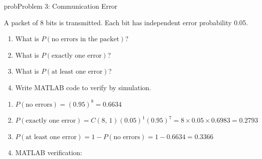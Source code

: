 \begin{PSbox}[unbreakable]{prob}{Problem 3: Communication Error}

A packet of 8 bits is transmitted. Each bit has independent error probability 0.05.

\begin{enumerate}
\def\labelenumi{(\alph{enumi})}
\tightlist
\item
  What is $P(\text{no errors in the packet})$?
\item
  What is $P(\text{exactly one error})$?
\item
  What is $P(\text{at least one error})$?
\item
  Write MATLAB code to verify by simulation.
\end{enumerate}

\PSsolution{} 

\begin{enumerate}
\def\labelenumi{(\alph{enumi})}
\item
  $P(\text{no errors}) = (0.95)^{8} = 0.6634$
\item
  $P(\text{exactly one error}) = C(8,\,1)(0.05)^{1}(0.95)^{7} = 8 \times 0.05 \times 0.6983 = 0.2793$
\item
  $P(\text{at least one error}) = 1 - P(\text{no errors}) = 1 - 0.6634 = 0.3366$
\item
  MATLAB verification:
\end{enumerate}



\end{PSbox}
